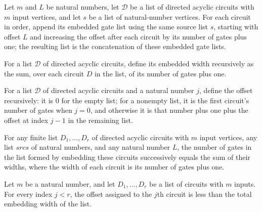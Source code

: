 \begin{definition}
\label{BoolCircuit.embedAll}
\leanok
{}
Let $m$ and $L$ be natural numbers, let $\mathcal D$ be a list of directed acyclic
circuits with $m$ input vertices, and let $s$ be a list of natural-number vertices. For
each circuit in order, append its embedded gate list using the same source list $s$,
starting with offset $L$ and increasing the offset after each circuit by its number of
gates plus one; the resulting list is the concatenation of these embedded gate lists.
\end{definition}

\begin{definition}
\label{BoolCircuit.embedWidth}
\leanok
{}
For a list $\mathcal D$ of directed acyclic circuits, define its embedded width
recursively as the sum, over each circuit $D$ in the list, of its number of gates plus
one.
\end{definition}

\begin{definition}
\label{BoolCircuit.embedOffset}
\leanok
{}
For a list $\mathcal D$ of directed acyclic circuits and a natural number $j$, define
the offset recursively: it is $0$ for the empty list; for a nonempty list, it is the
first circuit's number of gates when $j=0$, and otherwise it is that number plus one
plus the offset at index $j-1$ in the remaining list.
\end{definition}

\begin{theorem}
\label{BoolCircuit.length_embedAll}
\leanok
{}
For any finite list $D_1,\ldots,D_r$ of directed acyclic circuits with $m$ input
vertices, any list $srcs$ of natural numbers, and any natural number $L$, the number of
gates in the list formed by embedding these circuits successively equals the sum of
their widths, where the width of each circuit is its number of gates plus one.
\end{theorem}

\begin{theorem}
\label{BoolCircuit.embedOffset_lt}
\leanok
{}
Let $m$ be a natural number, and let $D_1,\ldots,D_r$ be a list of circuits with $m$
inputs. For every index $j<r$, the offset assigned to the $j$th circuit is less than the
total embedding width of the list.
\end{theorem}

